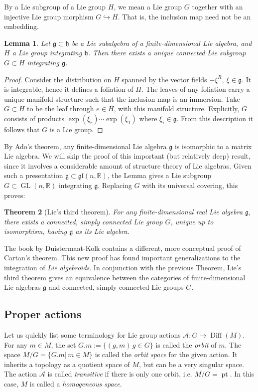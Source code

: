 \documentclass{article}
\newtheorem{theorem}{Theorem}[section]
\newtheorem{lemma}[theorem]{Lemma}
\theoremstyle{remark}
\newcommand\A{\mathcal{A}}
\newcommand{\R}{\mathbb{R}}
\newcommand\lie[1]{\mathfrak{#1}}
\newcommand{\h}{\lie{h}}
\newcommand{\g}{\lie{g}}
\newcommand{\on}{\operatorname}
\newcommand{\GL}{ \on{GL}}
\newcommand{\hra}{\hookrightarrow}
\newcommand\pt{\on{pt}}
\newcommand{\mf}{\mathfrak}
\begin{document}
By a Lie subgroup of a Lie group $H$, we mean a Lie group $G$ together with an injective Lie group morphism  
$G\hra H$. That is, the inclusion map need not be an embedding.  
%
\begin{lemma}
Let $\g\subset \h$ be a Lie subalgebra of a finite-dimensional Lie algebra, and $H$ a Lie group integrating 
$\h$. Then there exists a unique connected Lie subgroup $G\subset H$ integrating $\g$. 
\end{lemma}
\begin{proof}
Consider the distribution on $H$ spanned by the vector fields $-\xi^R,\ \xi\in\g$. It is integrable, 
hence it defines a foliation of $H$. The leaves of any foliation carry a unique manifold structure such that the 
inclusion map is an immersion. Take $G\subset H$ to be the leaf through $e\in H$, with this manifold structure. 
Explicitly, $G$ consists of products $\exp(\xi_r)\cdots \exp(\xi_1)$ where $\xi_i\in\g$. From this description it 
follows that $G$ is a Lie group.  
\end{proof}
%
By Ado's theorem, any finite-dimensional Lie algebra $\g$ is isomorphic to 
a matrix Lie algebra. We will skip the proof of this important (but relatively deep) result, since  
it involves a considerable amount of structure theory of Lie algebras. Given such a presentation 
$\g\subset \mf{gl}(n,\R)$, the Lemma gives a Lie subgroup $G\subset \GL(n,\R)$ integrating 
$\g$. Replacing  $G$ with its universal covering, this proves:
%
\begin{theorem} [Lie's third theorem]
For any finite-dimensional real Lie algebra $\g$, there exists a connected,  
simply connected Lie group $G$, unique up to isomorphism, having $\g$ as its Lie algebra. 
\end{theorem} 
%
The book by Duistermaat-Kolk contains a different, more conceptual proof of Cartan's theorem. This new 
proof has found important generalizations to the integration of \emph{Lie algebroids}. In conjunction with the previous Theorem, Lie's third theorem gives an equivalence between the categories of finite-dimensional Lie algebras $\g$
and connected, simply-connected Lie groups $G$. 





\subsection{Proper actions}

Let us quickly list some terminology for Lie group actions $\A\colon G\to \on{Diff}(M)$. 
For any $m\in M$, the set $G.m:=\{(g,m)\,g\in G\}$ is called the 
{\em orbit} of $m$. The space $M/G=\{G.m|\,m\in M\}$ is called the \emph{orbit space} 
for the given action. It inherits a topology as a quotient space of $M$, but can be 
a very singular space. The action $\A$ is called {\em transitive} if there is only one orbit, i.e. 
$M/G=\pt$. In this case, $M$ is called a \emph{homogeneous space}. 
\end{document}
